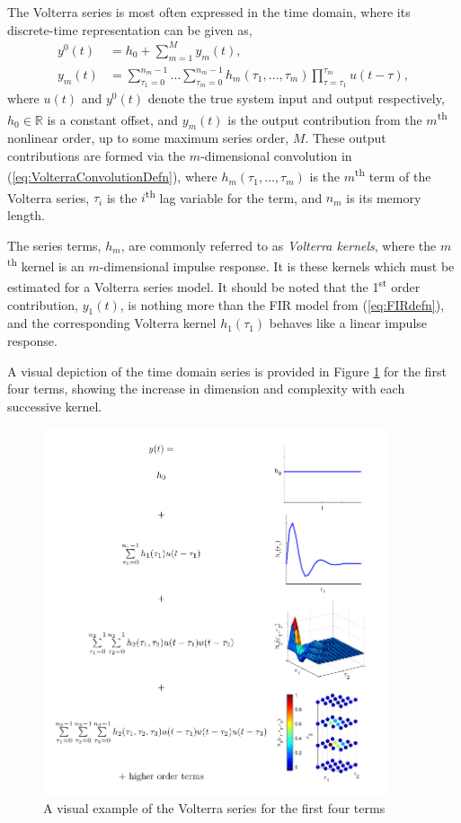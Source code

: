 The Volterra series is most often expressed in the time domain, where its discrete-time representation can be given as,
\begin{align}
y^0(t) &= h_0 + \sum_{m=1}^M y_m(t), \label{eq:VolterraTimeDomainOutput} \\
y_m(t) &= \sum_{\tau_1 = 0}^{n_m-1} \hdots \sum_{\tau_m=0}^{n_m-1} h_m(\tau_1, \hdots, \tau_m) \prod_{\tau=\tau_1}^{\tau_m} u(t-\tau), \label{eq:VolterraConvolutionDefn}
\end{align}
where $u(t)$ and $y^0(t)$ denote the true system input and output respectively, $h_0 \in \mathbb{R}$ is a constant offset, and $y_m(t)$ is the output contribution from the $m$\textsuperscript{th} nonlinear order, up to some maximum series order, $M$. These output contributions are formed via the $m$-dimensional convolution in (\ref{eq:VolterraConvolutionDefn}), where $h_m(\tau_1, \hdots, \tau_m)$ is the $m$\textsuperscript{th} term of the Volterra series, $\tau_i$ is the $i$\textsuperscript{th} lag variable for the term, and $n_m$ is its memory length.

The series terms, $h_m$, are commonly referred to as \emph{Volterra kernels}, where the $m$\textsuperscript{th} kernel is an $m$-dimensional impulse response. It is these kernels which must be estimated for a Volterra series model. It should be noted that the 1\textsuperscript{st} order contribution, $y_1(t)$, is nothing more than the FIR model from (\ref{eq:FIRdefn}), and the corresponding Volterra kernel $h_1(\tau_1)$ behaves like a linear impulse response. 

A visual depiction of the time domain series is provided in Figure \ref{fig:VolterraSeriesVisualised} for the first four terms, showing the increase in dimension and complexity with each successive kernel.

\begin{figure}[h]
\centering
\includegraphics[width=0.9\textwidth]{Chapter3_VolterraSeries/PictorialSeries.pdf}
\caption{A visual example of the Volterra series for the first four terms}
\label{fig:VolterraSeriesVisualised}
\end{figure}

